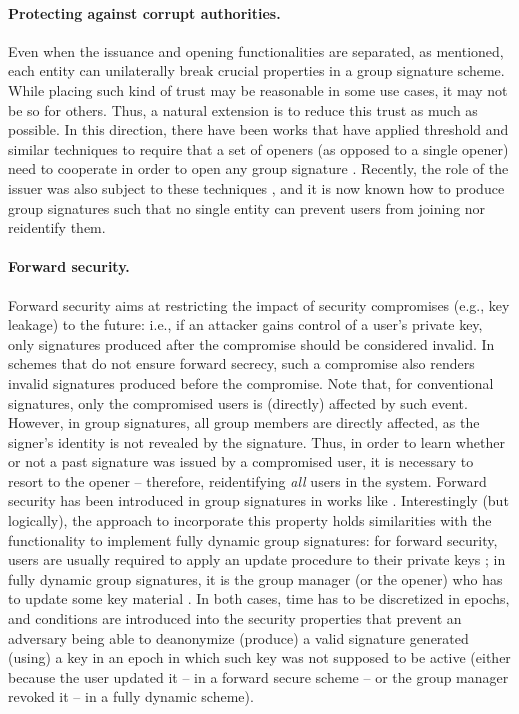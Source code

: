 \paragraph{Protecting against corrupt authorities.}
Even when the issuance and opening functionalities are separated, as mentioned,
each entity can unilaterally break crucial properties in a group signature scheme.
While placing such kind of trust may be reasonable in some use cases, it may not
be so for others. Thus, a natural extension is to reduce this trust as much as
possible. In this direction, there have been works that have applied threshold
and similar techniques \needcite to require that a set of openers (as opposed
to a single opener) need to cooperate in order to open any group signature
\cite{bcly08} \needcite.
Recently, the role of the issuer was also subject to these techniques
\cite{cdl+20}, and it is now known how to produce group signatures such that no
single entity can prevent users from joining nor reidentify them.

\paragraph{Forward security.}
Forward security aims at restricting the impact of security compromises (e.g.,
key leakage) to the future: i.e., if an attacker gains control of a user's
private key, only signatures produced after the compromise should be considered
invalid. In schemes that do not ensure forward secrecy, such a compromise also
renders invalid signatures produced before the compromise. Note that, for
conventional signatures, only the compromised users is (directly) affected by
such event. However,  in group signatures, all group members are directly
affected, as the signer's identity is not revealed by the signature. Thus,
in order to learn whether or not a past signature was issued by a compromised
user, it is necessary to resort to the opener -- therefore, reidentifying
\emph{all} users in the system.
%
Forward security has been introduced in group signatures in works like
\cite{song01,ly12} \needcite.
%
Interestingly (but logically), the approach to incorporate this property
holds similarities with the functionality to implement fully dynamic group
signatures: for forward security, users are usually required to apply an
update procedure to their private keys \cite{ly12}; in fully dynamic group
signatures, it is the group manager (or the opener) who has to update some
key material \cite{bcc+16}. In both cases, time has to be discretized in epochs,
and conditions are introduced into the security properties that prevent an
adversary being able to deanonymize (produce) a valid signature generated
(using) a key in an epoch in which such key was not supposed to be active
(either because the user updated it -- in a forward secure scheme -- or the
group manager revoked it -- in a fully dynamic scheme).

